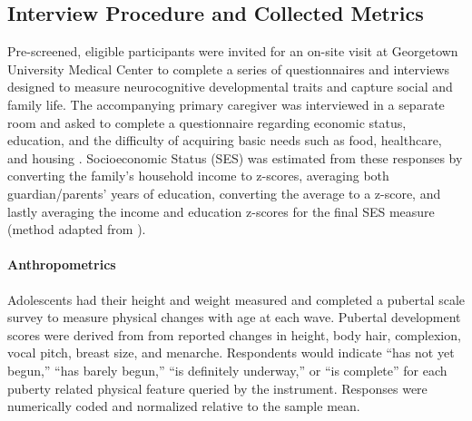 \documentclass[utf8]{frontiersSCNS} %
\begin{document}
\subsection{Interview Procedure and Collected Metrics} Pre-screened, eligible participants were invited for an on-site visit at Georgetown University Medical Center to complete a series of questionnaires and interviews designed to measure neurocognitive developmental traits and capture social and family life. The accompanying primary caregiver was interviewed in a separate room and asked to complete a questionnaire regarding economic status, education, and the difficulty of acquiring basic needs such as food, healthcare, and housing \citep{bornstein2003socioeconomic}. Socioeconomic Status (SES) was estimated from these responses by converting the family’s household income to z-scores, averaging both guardian/parents' years of education, converting the average to a z-score, and lastly averaging the income and education z-scores for the final SES measure (method adapted from \cite{manuck2010ses}).
\paragraph{Anthropometrics} Adolescents had their height and weight measured and completed a pubertal scale survey \citep{carskadon1993self} to measure physical changes with age at each wave. Pubertal development scores were derived from from reported changes in height, body hair, complexion, vocal pitch, breast size, and menarche. Respondents would indicate “has not yet begun,” “has barely begun,” “is definitely underway,” or “is complete” for each puberty related physical feature queried by the instrument. Responses were numerically coded and normalized relative to the sample mean.
\end{document}
